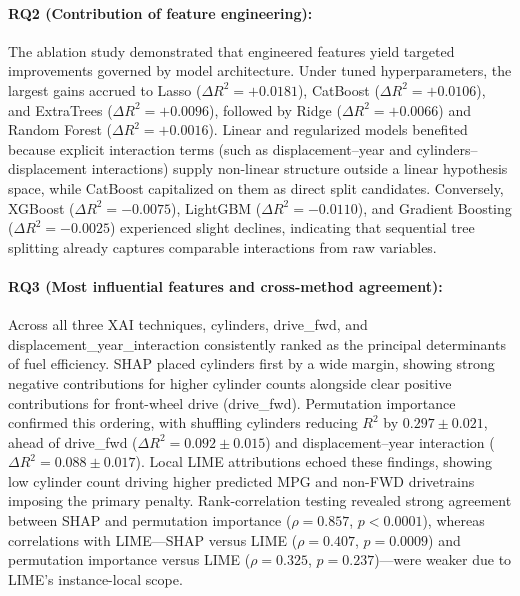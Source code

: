\paragraph{RQ2 (Contribution of feature engineering):}
The ablation study demonstrated that engineered features yield targeted improvements governed by model architecture. Under tuned hyperparameters, the largest gains accrued to Lasso (\(\Delta R^2 = +0.0181\)), CatBoost (\(\Delta R^2 = +0.0106\)), and ExtraTrees (\(\Delta R^2 = +0.0096\)), followed by Ridge (\(\Delta R^2 = +0.0066\)) and Random Forest (\(\Delta R^2 = +0.0016\)). Linear and regularized models benefited because explicit interaction terms (such as displacement--year and cylinders--displacement interactions) supply non-linear structure outside a linear hypothesis space, while CatBoost capitalized on them as direct split candidates. Conversely, XGBoost (\(\Delta R^2 = -0.0075\)), LightGBM (\(\Delta R^2 = -0.0110\)), and Gradient Boosting (\(\Delta R^2 = -0.0025\)) experienced slight declines, indicating that sequential tree splitting already captures comparable interactions from raw variables.

\paragraph{RQ3 (Most influential features and cross-method agreement):}
Across all three XAI techniques, cylinders, drive\_fwd, and displacement\_year\_interaction consistently ranked as the principal determinants of fuel efficiency. SHAP placed cylinders first by a wide margin, showing strong negative contributions for higher cylinder counts alongside clear positive contributions for front-wheel drive (drive\_fwd). Permutation importance confirmed this ordering, with shuffling cylinders reducing \(R^2\) by \(0.297 \pm 0.021\), ahead of drive\_fwd (\(\Delta R^2 = 0.092 \pm 0.015\)) and displacement--year interaction (\(\Delta R^2 = 0.088 \pm 0.017\)). Local LIME attributions echoed these findings, showing low cylinder count driving higher predicted MPG and non-FWD drivetrains imposing the primary penalty. Rank-correlation testing revealed strong agreement between SHAP and permutation importance (\(\rho = 0.857\), \(p < 0.0001\)), whereas correlations with LIME---SHAP versus LIME (\(\rho = 0.407\), \(p = 0.0009\)) and permutation importance versus LIME (\(\rho = 0.325\), \(p = 0.237\))---were weaker due to LIME's instance-local scope.

